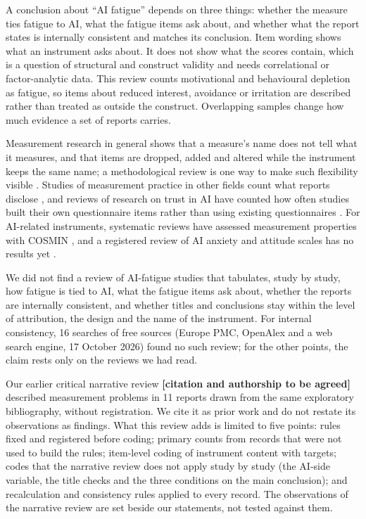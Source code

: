 \documentclass[11pt]{article}
\newcommand{\tbd}[1]{\textbf{[#1]}}
\begin{document}
A conclusion about ``AI fatigue'' depends on three things: whether the measure ties fatigue to AI, what the fatigue
items ask about, and whether what the report states is internally consistent and matches its conclusion. Item wording
shows what an instrument asks about. It does not show what the scores contain, which is a question of structural and
construct validity and needs correlational or factor-analytic data. This review counts motivational and behavioural
depletion as fatigue, so items about reduced interest, avoidance or irritation are described rather than treated as
outside the construct. Overlapping samples change how much evidence a set of reports carries.

Measurement research in general shows that a measure's name does not tell what it measures, and that items are
dropped, added and altered while the instrument keeps the same name; a methodological review is one way to make such
flexibility visible \citep{elson2023}. Studies of measurement practice in other fields count what reports disclose
\citep{perrig2024}, and reviews of research on trust in AI have counted how often studies built their own
questionnaire items rather than using existing questionnaires \citep{bach2022,benk2024}. For AI-related instruments,
systematic reviews have assessed measurement properties with COSMIN \citep[for example,][on AI literacy
scales]{lintner2024}, and a registered review of AI anxiety and attitude scales has no results yet
\citep{jonaid2026}.

We did not find a review of AI-fatigue studies that tabulates, study by study, how fatigue is tied to AI, what the
fatigue items ask about, whether the reports are internally consistent, and whether titles and conclusions stay within
the level of attribution, the design and the name of the instrument. For internal consistency, 16 searches of free
sources (Europe PMC, OpenAlex and a web search engine, 17 October 2026) found no such review; for the other points, the
claim rests only on the reviews we had read.

Our earlier critical narrative review \tbd{citation and authorship to be agreed} described measurement problems in 11
reports drawn from the same exploratory bibliography, without registration. We cite it as prior work and do not
restate its observations as findings. What this review adds is limited to five points: rules fixed and registered
before coding; primary counts from records that were not used to build the rules; item-level coding of instrument
content with targets; codes that the narrative review does not apply study by study (the AI-side variable, the title
checks and the three conditions on the main conclusion); and recalculation and consistency rules applied to every
record. The observations of the narrative review are set beside our statements, not tested against them.
\end{document}
